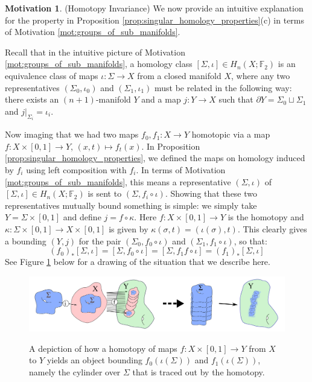 \documentclass[12pt]{article}
\theoremstyle{definition}
\newtheorem{motivation}[theorem]{Motivation}
\numberwithin{equation}{section}
\begin{document}
\begin{motivation} (Homotopy Invariance) We now provide an intuitive explanation for the property in Proposition \ref{prop:singular_homology_properties}(c) in terms of Motivation \ref{mot:groups_of_sub_manifolds}. 

Recall that in the intuitive picture of Motivation \ref{mot:groups_of_sub_manifolds}, a homology class $[\Sigma,\iota] \in H_n(X;\mathbb{F}_2)$ is an equivalence class of maps $\iota:\Sigma \to X$ from a closed manifold $X$, where any two representatives $(\Sigma_0,\iota_0)$ and $(\Sigma_1,\iota_1)$ must be related in the following way: there exists an $(n+1)$-manifold $Y$ and a map $j:Y \to X$ such that $\partial Y = \Sigma_0 \sqcup \Sigma_1$ and $j|_{\Sigma_i} = \iota_i$.

Now imaging that we had two maps $f_0,f_1:X \to Y$ homotopic via a map $f:X \times [0,1] \to Y$, $(x,t) \mapsto f_t(x)$. In Proposition \ref{prop:singular_homology_properties}, we defined the maps on homology induced by $f_i$ using left composition with $f_i$. In terms of Motivation \ref{mot:groups_of_sub_manifolds}, this means a representative $(\Sigma,\iota)$ of $[\Sigma,\iota] \in H_n(X;\mathbb{F}_2)$ is sent to $(\Sigma,f_i \circ \iota)$. Showing that these two representatives mutually bound something is simple: we simply take $Y = \Sigma \times [0,1]$ and define $j = f \circ \kappa$. Here $f:X \times [0,1] \to Y$ is the homotopy and $\kappa:\Sigma \times [0,1] \to X \times [0,1]$ is given by $\kappa(\sigma,t) = (\iota(\sigma),t)$. This clearly gives a bounding $(Y,j)$ for the pair $(\Sigma_0,f_0 \circ \iota)$ and $(\Sigma_1,f_1 \circ \iota)$, so that:
\[
(f_0)_*[\Sigma,\iota] = [\Sigma,f_0 \circ \iota] = [\Sigma,f_1f \circ \iota] = (f_1)_*[\Sigma,\iota]
\]
See Figure \ref{fig:chain_homotopy_picture} below for a drawing of the situation that we describe here.
\end{motivation}

\begin{figure}[h]
    \centering
    \includegraphics[width=1\textwidth]{reu_figures/homotopy_picture.png}
    \label{fig:chain_homotopy_picture}
    \caption{A depiction of how a homotopy of maps $f:X \times [0,1] \to Y$ from $X$ to $Y$ yields an object bounding $f_0(\iota(\Sigma))$ and $f_1(\iota(\Sigma))$, namely the cylinder over $\Sigma$ that is traced out by the homotopy.}
\end{figure}
\end{document}
